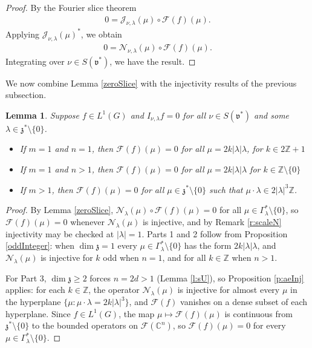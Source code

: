 \documentclass[11pt]{amsart}
\theoremstyle{plain}
\newtheorem{lemma}[theorem]{Lemma}
\theoremstyle{definition}
\theoremstyle{remark}
\numberwithin{equation}{section}
\def\fz{\mathfrak{z}}
\def\fv{\mathfrak{v}}
\def\cN{\mathcal{N}}
\def\cJ{\mathcal{J}}
\def\cF{\mathcal{F}}
\def\mz{\setminus\{0\}}
\def\C{{\mathbb C}}%
\def\Z{{\mathbb Z}}%
\numberwithin{equation}{section}
\begin{document}
\begin{proof}
	By the Fourier slice theorem 
	\begin{align*}
		0=\cJ_{\nu, \lambda}(\mu)\circ\cF(f)(\mu).
	\end{align*}
	Applying $\cJ_{\nu, \lambda}(\mu)^*$, we obtain
	\begin{align*}
		0=\cN_{\nu, \lambda}(\mu)\circ\cF(f)(\mu).
	\end{align*}
	Integrating over $\nu\in S(\fv^*)$, we have the result. 
\end{proof}

We now combine Lemma \ref{zeroSlice} with the injectivity results of the previous subsection.
\begin{lemma}\label{PW}
	Suppose $f\in L^1(G)$ and $I_{\nu, \lambda}f=0$ for all $\nu\in S(\fv^*)$ and some $\lambda\in \fz^*\mz$.
	\begin{itemize}
		\item[1.] If $m=1$ and $n=1$, then $\cF(f)(\mu)=0$ for all $\mu=2k|\lambda|\lambda$, for $k\in 2\Z+1$
		\item[2.] If $m=1$ and $n>1$, then $\cF(f)(\mu)=0$ for all $\mu=2k|\lambda|\lambda$ for $k\in \Z\mz$
		\item[3.] If $m>1$, then $\cF(f)(\mu)=0$ for all $\mu\in \fz^*\mz$ such that $\mu\cdot\lambda\in 2|\lambda|^3\Z$.
	\end{itemize}
\end{lemma}
\begin{proof}
	By Lemma \ref{zeroSlice}, $\cN_\lambda(\mu)\circ\cF(f)(\mu)=0$ for all $\mu\in \Gamma_\lambda^*\mz$, so $\cF(f)(\mu)=0$ whenever $\cN_\lambda(\mu)$ is injective, and by Remark \ref{r:scaleN} injectivity may be checked at $|\lambda|=1$. Parts 1 and 2 follow from Proposition \ref{oddInteger}: when $\dim\fz=1$ every $\mu\in \Gamma_\lambda^*\mz$ has the form $2k|\lambda|\lambda$, and $\cN_\lambda(\mu)$ is injective for $k$ odd when $n=1$, and for all $k\in \Z$ when $n>1$.

	For Part 3, $\dim\fz\geq2$ forces $n=2d>1$ (Lemma \ref{l:sU}), so Proposition \ref{p:aeInj} applies: for each $k\in \Z$, the operator $\cN_\lambda(\mu)$ is injective for almost every $\mu$ in the hyperplane $\{\mu: \mu\cdot\lambda=2k|\lambda|^3\}$, and $\cF(f)$ vanishes on a dense subset of each hyperplane. Since $f\in L^1(G)$, the map $\mu\mapsto\cF(f)(\mu)$ is continuous from $\fz^*\mz$ to the bounded operators on $\cF(\C^n)$, so $\cF(f)(\mu)=0$ for every $\mu\in \Gamma_\lambda^*\mz$.
\end{proof}
\end{document}
